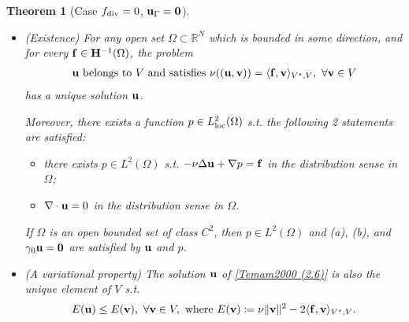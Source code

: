 \documentclass[oneside]{book}
\numberwithin{equation}{section}
\newtheorem{theorem}{Theorem}[section]
\begin{document}
\begin{theorem}[Case $f_{\rm div} = 0$, ${\bf u}_\Gamma = {\bf 0}$]
    \begin{itemize}
        \item[(i)] (Existence) For any open set $\Omega\subset\mathbb{R}^N$ which is bounded in some direction, and for every ${\bf f}\in{\bf H}^{-1}(\Omega)$, the problem
        \begin{align}
            \label{Temam2000 (2.6)}
            {\bf u} \mbox{ belongs to } V \mbox{ and satisfies } \nu(({\bf u},{\bf v})) = \langle{\bf f},{\bf v}\rangle_{V^\star,V},\ \forall{\bf v}\in V
        \end{align}
        has a unique solution ${\bf u}$.
        
        Moreover, there exists a function $p\in L_{\rm loc}^2(\Omega)$ s.t. the following 2 statements are satisfied:
        \begin{itemize}
            \item[(a)] there exists $p\in L^2(\Omega)$ s.t. $-\nu\Delta{\bf u} + \nabla p = {\bf f}$ in the distribution sense in $\Omega$;
            \item[(b)] $\nabla\cdot{\bf u} = 0$ in the distribution sense in $\Omega$.
        \end{itemize}    
        If $\Omega$ is an open bounded set of class $C^2$, then $p\in L^2(\Omega)$ and (a), (b), and $\gamma_0{\bf u} = {\bf 0}$ are satisfied by ${\bf u}$ and $p$.
        \item[(ii)] (A variational property) The solution ${\bf u}$ of \eqref{Temam2000 (2.6)} is also the unique element of $V$ s.t.
        \begin{align*}
            E({\bf u})\le E({\bf v}),\ \forall{\bf v}\in V, \mbox{ where } E({\bf v})\coloneqq\nu\|{\bf v}\|^2 - 2\langle{\bf f},{\bf v}\rangle_{V^\star,V}.
        \end{align*}
    \end{itemize}    
\end{theorem}
\end{document}
